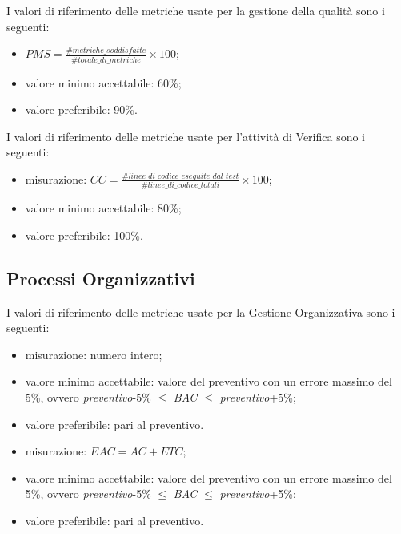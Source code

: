 	I valori di riferimento delle metriche usate per la gestione della qualità sono i seguenti:
	
			\begin{itemize}
				\item{$PMS=\displaystyle\frac{\#metriche\_soddisfatte}{\#totale\_di\_metriche} \times 100$;}
				\item{valore minimo accettabile: 60\%;}
				\item{valore preferibile: 90\%.}
			\end{itemize}
					
	I valori di riferimento delle metriche usate per l'attività di Verifica sono i seguenti:
	
		 	\begin{itemize}
				\item{misurazione: $ CC = \displaystyle\frac{\#linee\_di\_codice\_eseguite\_dal\_test}{\#linee\_di\_codice\_totali} \times 100$;}
				\item{valore minimo accettabile: 80\%;}
				\item{valore preferibile: 100\%.}
			\end{itemize}

\subsection{Processi Organizzativi}

	I valori di riferimento delle metriche usate per la Gestione Organizzativa sono i seguenti:
	
			\begin{itemize}
				\item{misurazione: numero intero;}
				\item{valore minimo accettabile: valore del preventivo con un errore massimo del 5\%, ovvero \textit{preventivo}-5\% $\leq$ \textit{BAC} $\leq$ \textit{preventivo}+5\%;}
				\item{valore preferibile: pari al preventivo.}
			\end{itemize}
		
			\begin{itemize}
				\item{misurazione: $EAC = AC + ETC$;}
				\item{valore minimo accettabile: valore del preventivo con un errore massimo del 5\%, ovvero \textit{preventivo}-5\% $\leq$ \textit{BAC} $\leq$ \textit{preventivo}+5\%;}
				\item{valore preferibile: pari al preventivo.}
			\end{itemize}
		
